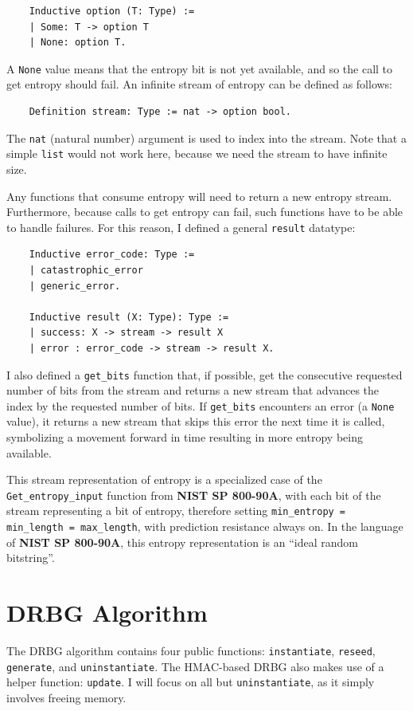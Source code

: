 \documentclass[pageno]{jpaper}
\newcommand{\stdtitle}[1]{\textbf{#1}}
\begin{document}
\begin{lstlisting}
    Inductive option (T: Type) :=
    | Some: T -> option T
    | None: option T.
\end{lstlisting}

A \lstinline{None} value means that the entropy bit is not yet available, and so the call to get entropy should fail. An infinite stream of entropy can be defined as follows:

\begin{lstlisting}
    Definition stream: Type := nat -> option bool.
\end{lstlisting}

The \lstinline{nat} (natural number) argument is used to index into the stream. Note that a simple \lstinline{list} would not work here, because we need the stream to have infinite size.

Any functions that consume entropy will need to return a new entropy stream. Furthermore, because calls to get entropy can fail, such functions have to be able to handle failures. For this reason, I defined a general \lstinline{result} datatype:

\begin{lstlisting}
    Inductive error_code: Type :=
    | catastrophic_error
    | generic_error.

    Inductive result (X: Type): Type :=
    | success: X -> stream -> result X
    | error : error_code -> stream -> result X.
\end{lstlisting}

I also defined a \lstinline{get_bits} function that, if possible, get the consecutive requested number of bits from the stream and returns a new stream that advances the index by the requested number of bits. If \lstinline{get_bits} encounters an error (a \lstinline{None} value), it returns a new stream that skips this error the next time it is called, symbolizing a movement forward in time resulting in more entropy being available.

This stream representation of entropy is a specialized case of the \lstinline{Get_entropy_input} function from \stdtitle{NIST SP 800-90A}, with each bit of the stream representing a bit of entropy, therefore setting \lstinline{min_entropy = min_length = max_length}, with prediction resistance always on. In the language of \stdtitle{NIST SP 800-90A}, this entropy representation is an “ideal random bitstring”.

\section{DRBG Algorithm}
The DRBG algorithm contains four public functions: \lstinline{instantiate}, \lstinline{reseed}, \lstinline{generate}, and \lstinline{uninstantiate}. The HMAC-based DRBG also makes use of a helper function: \lstinline{update}. I will focus on all but \lstinline{uninstantiate}, as it simply involves freeing memory.
\end{document}
